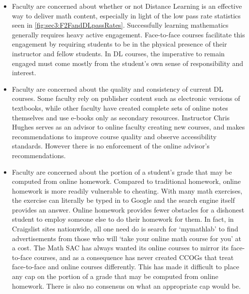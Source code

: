 \begin{itemize}
	\item Faculty are concerned about whether or not Distance Learning is an effective way to deliver math content, especially in light of the low pass rate statistics seen in \cref{fig:sec3:F2FandDLpassRates}.
	      Successfully learning mathematics generally requires heavy active engagement.
	      Face-to-face courses facilitate this engagement by requiring students to be in the physical presence of their instructor and fellow students.
	      In DL courses, the imperative to remain engaged must come mostly from the student's own sense of responsibility and interest.
	\item Faculty are concerned about the quality and consistency of current DL courses.
	      Some faculty rely on publisher content such as electronic versions of textbooks, while other faculty have created complete sets of online notes themselves and use e-books only as secondary resources.
	      Instructor Chris Hughes serves as an advisor to online faculty creating new courses, and makes recommendations to improve course quality and observe accessibility standards.
	      However there is no enforcement of the online advisor's recommendations.
	\item Faculty are concerned about the portion of a student's grade that may be computed from online homework.
	      Compared to traditional homework, online homework is more readily vulnerable to cheating.
	      With many math exercises, the exercise can literally be typed in to Google and the search engine itself provides an answer.
	      Online homework provides fewer obstacles for a dishonest student to employ someone else to do their homework for them.
	      In fact, in Craigslist sites nationwide, all one need do is search for `mymathlab' to find advertisements from those who will `take your online math course for you' at a cost.
	      The Math SAC has always wanted its online courses to mirror its face-to-face courses, and as a consequence has never created CCOGs that treat face-to-face and online courses differently.
	      This has made it difficult to place any cap on the portion of a grade that may be computed from online homework.
	      There is also no consensus on what an appropriate cap would be.
\end{itemize}

